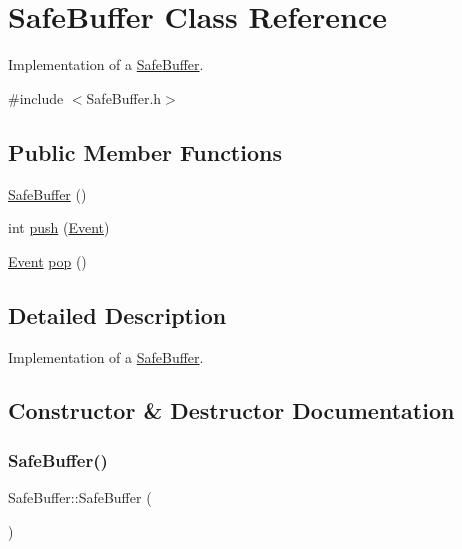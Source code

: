\hypertarget{class_safe_buffer}{}\section{Safe\+Buffer Class Reference}
\label{class_safe_buffer}


Implementation of a \hyperlink{class_safe_buffer}{Safe\+Buffer}.  




{\ttfamily \#include $<$Safe\+Buffer.\+h$>$}

\subsection*{Public Member Functions}
\begin{DoxyCompactItemize}
\item 
\hyperlink{class_safe_buffer_af835d8d08c4dcd3326f21ae2e9988699}{Safe\+Buffer} ()
\item 
int \hyperlink{class_safe_buffer_ac3ed0799ec2e84c97e36b22c83f7abf5}{push} (\hyperlink{class_event}{Event})
\item 
\hyperlink{class_event}{Event} \hyperlink{class_safe_buffer_a90a33fca4d838f7c0eef6e8557f3c281}{pop} ()
\end{DoxyCompactItemize}


\subsection{Detailed Description}
Implementation of a \hyperlink{class_safe_buffer}{Safe\+Buffer}. 

\subsection{Constructor \& Destructor Documentation}
\mbox{\label{class_safe_buffer_af835d8d08c4dcd3326f21ae2e9988699}} 
\subsubsection{\texorpdfstring{Safe\+Buffer()}{SafeBuffer()}}
{\footnotesize\ttfamily Safe\+Buffer\+::\+Safe\+Buffer (\begin{DoxyParamCaption}{ }\end{DoxyParamCaption})}



